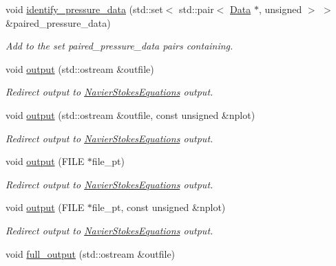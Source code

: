 \begin{DoxyCompactItemize}
void \hyperlink{classoomph_1_1GeneralisedNewtonianQCrouzeixRaviartElement_aa27ed653fcc13e9f615d0f120ccb09c6}{identify\+\_\+pressure\+\_\+data} (std\+::set$<$ std\+::pair$<$ \hyperlink{classoomph_1_1Data}{Data} $\ast$, unsigned $>$ $>$ \&paired\+\_\+pressure\+\_\+data)
\begin{DoxyCompactList}\small\item\em Add to the set {\ttfamily paired\+\_\+pressure\+\_\+data} pairs containing. \end{DoxyCompactList}\item 
void \hyperlink{classoomph_1_1GeneralisedNewtonianQCrouzeixRaviartElement_a243e373aca5dedfea4efb4d976434d3a}{output} (std\+::ostream \&outfile)
\begin{DoxyCompactList}\small\item\em Redirect output to \hyperlink{classoomph_1_1NavierStokesEquations}{Navier\+Stokes\+Equations} output. \end{DoxyCompactList}\item 
void \hyperlink{classoomph_1_1GeneralisedNewtonianQCrouzeixRaviartElement_a8479877ac6783559f319414c38245543}{output} (std\+::ostream \&outfile, const unsigned \&nplot)
\begin{DoxyCompactList}\small\item\em Redirect output to \hyperlink{classoomph_1_1NavierStokesEquations}{Navier\+Stokes\+Equations} output. \end{DoxyCompactList}\item 
void \hyperlink{classoomph_1_1GeneralisedNewtonianQCrouzeixRaviartElement_a5229c52c67179de461423ab34d7f8a7d}{output} (F\+I\+LE $\ast$file\+\_\+pt)
\begin{DoxyCompactList}\small\item\em Redirect output to \hyperlink{classoomph_1_1NavierStokesEquations}{Navier\+Stokes\+Equations} output. \end{DoxyCompactList}\item 
void \hyperlink{classoomph_1_1GeneralisedNewtonianQCrouzeixRaviartElement_aa6119cf023b202657222a8d6ee86612c}{output} (F\+I\+LE $\ast$file\+\_\+pt, const unsigned \&nplot)
\begin{DoxyCompactList}\small\item\em Redirect output to \hyperlink{classoomph_1_1NavierStokesEquations}{Navier\+Stokes\+Equations} output. \end{DoxyCompactList}\item 
void \hyperlink{classoomph_1_1GeneralisedNewtonianQCrouzeixRaviartElement_a1a729e19ee5a5b4deb7c3f8a78786d63}{full\+\_\+output} (std\+::ostream \&outfile)

\end{DoxyCompactItemize}
